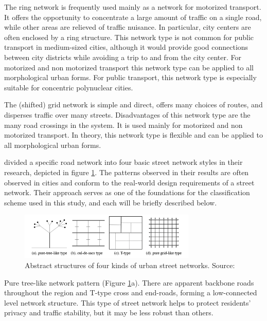 The ring network is frequently used mainly as a network for motorized transport. It offers the opportunity to concentrate a large amount of traffic on a single road, while other areas are relieved of traffic nuisance. In particular, city centers are often enclosed by a ring structure. This network type is not common for public transport in medium-sized cities, although it would provide good connections between city districts while avoiding a trip to and from the city center. For motorized and non motorized transport this network type can be applied to all morphological urban forms. For public transport, this network type is especially suitable for concentric polynuclear cities. \cite{Snellen:2002}

The (shifted) grid network is simple and direct, offers many choices of routes, and disperses traffic over many streets. Disadvantages of this network type are the many road crossings in the system. It is used mainly for motorized and non motorized transport. In theory, this network type is flexible and can be applied to all morphological urban forms. \cite{Snellen:2002}

\cite{Chan:2011,Lima:2015} divided a specific road network into four basic street network styles in their research, depicted in figure \ref{fig:transportnetworks}.  The patterns observed in their results are often observed in cities and conform to the real-world design requirements of a street network. Their approach serves as one of the foundations for the classification scheme used in this study, and each will be briefly described below.

\begin{figure}[!ht]
\centering
\includegraphics[width=0.75\textwidth,center]{picture/Cul de.png}
\caption[Abstract Structures of Four Kinds of Urban Street Networks]{Abstract structures of four kinds of urban street networks. Source: \cite{Han:2020}}
\label{fig:transportnetworks}
\end{figure}

Pure tree-like network pattern (Figure \ref{fig:transportnetworks}a). There are apparent backbone roads throughout the region and T-type cross and end-roads, forming a low-connected level network structure. This type of street network helps to protect residents' privacy and traffic stability, but it may be less robust than others.

